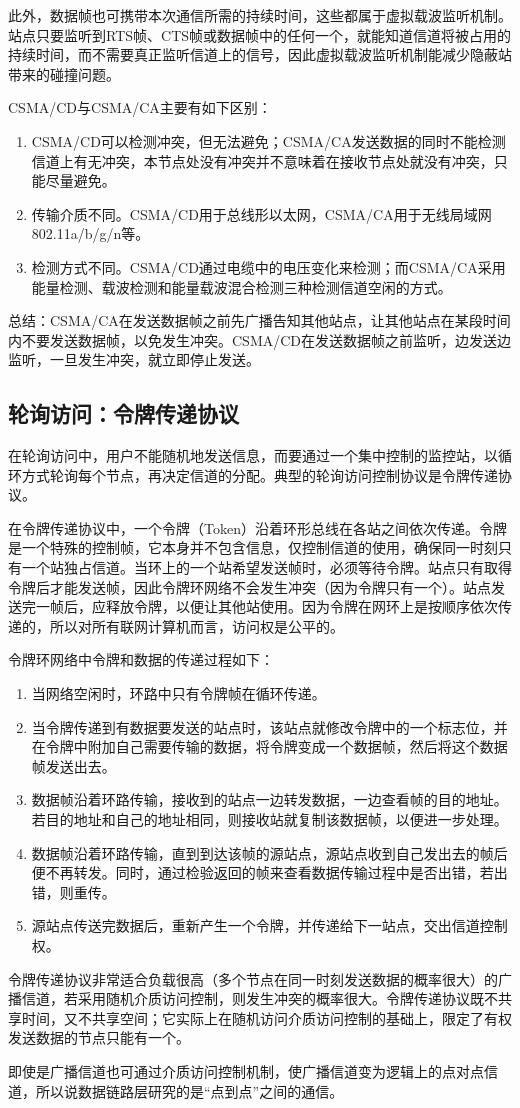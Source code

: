 \documentclass{ctexbook}
\begin{document}
	此外，数据帧也可携带本次通信所需的持续时间，这些都属于虚拟载波监听机制。站点只要监听到RTS帧、CTS帧或数据帧中的任何一个，就能知道信道将被占用的持续时间，而不需要真正监听信道上的信号，因此虚拟载波监听机制能减少隐蔽站带来的碰撞问题。
	
	CSMA/CD与CSMA/CA主要有如下区别：
	\begin{enumerate}
		\item CSMA/CD可以检测冲突，但无法避免；CSMA/CA发送数据的同时不能检测信道上有无冲突，本节点处没有冲突并不意味着在接收节点处就没有冲突，只能尽量避免。
		\item 传输介质不同。CSMA/CD用于总线形以太网，CSMA/CA用于无线局域网802.11a/b/g/n等。
		\item 检测方式不同。CSMA/CD通过电缆中的电压变化来检测；而CSMA/CA采用能量检测、载波检测和能量载波混合检测三种检测信道空闲的方式。
	\end{enumerate}
	
	总结：CSMA/CA在发送数据帧之前先广播告知其他站点，让其他站点在某段时间内不要发送数据帧，以免发生冲突。CSMA/CD在发送数据帧之前监听，边发送边监听，一旦发生冲突，就立即停止发送。
	
	\subsection{轮询访问：令牌传递协议}
	在轮询访问中，用户不能随机地发送信息，而要通过一个集中控制的监控站，以循环方式轮询每个节点，再决定信道的分配。典型的轮询访问控制协议是令牌传递协议。
	
	在令牌传递协议中，一个令牌（Token）沿着环形总线在各站之间依次传递。令牌是一个特殊的控制帧，它本身并不包含信息，仅控制信道的使用，确保同一时刻只有一个站独占信道。当环上的一个站希望发送帧时，必须等待令牌。站点只有取得令牌后才能发送帧，因此令牌环网络不会发生冲突（因为令牌只有一个）。站点发送完一帧后，应释放令牌，以便让其他站使用。因为令牌在网环上是按顺序依次传递的，所以对所有联网计算机而言，访问权是公平的。
	
	令牌环网络中令牌和数据的传递过程如下：
	\begin{enumerate}
		\item 当网络空闲时，环路中只有令牌帧在循环传递。
		\item 当令牌传递到有数据要发送的站点时，该站点就修改令牌中的一个标志位，并在令牌中附加自己需要传输的数据，将令牌变成一个数据帧，然后将这个数据帧发送出去。
		\item 数据帧沿着环路传输，接收到的站点一边转发数据，一边查看帧的目的地址。若目的地址和自己的地址相同，则接收站就复制该数据帧，以便进一步处理。
		\item 数据帧沿着环路传输，直到到达该帧的源站点，源站点收到自己发出去的帧后便不再转发。同时，通过检验返回的帧来查看数据传输过程中是否出错，若出错，则重传。
		\item 源站点传送完数据后，重新产生一个令牌，并传递给下一站点，交出信道控制权。
	\end{enumerate}
	
	令牌传递协议非常适合负载很高（多个节点在同一时刻发送数据的概率很大）的广播信道，若采用随机介质访问控制，则发生冲突的概率很大。令牌传递协议既不共享时间，又不共享空间；它实际上在随机访问介质访问控制的基础上，限定了有权发送数据的节点只能有一个。
	
	即使是广播信道也可通过介质访问控制机制，使广播信道变为逻辑上的点对点信道，所以说数据链路层研究的是“点到点”之间的通信。
	
	
	
\end{document}
